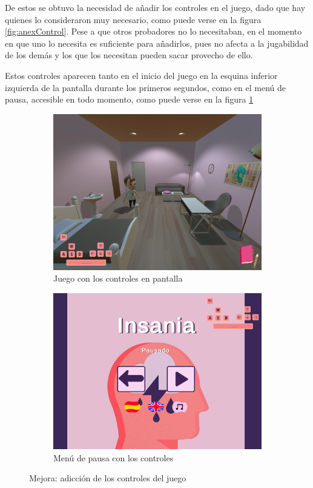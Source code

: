 \documentclass[12pt, a4paper,twoside,titlepage]{book}
\begin{document}
De estos se obtuvo la necesidad de añadir los controles en el juego, dado que hay quienes lo consideraron muy necesario, como puede verse en la figura \ref{fig:anexControl}. Pese a que otros probadores no lo necesitaban, en el momento en que uno lo necesita es suficiente para añadirlos, pues no afecta a la jugabilidad de los demás y los que los necesitan pueden sacar provecho de ello. 

Estos controles aparecen tanto en el inicio del juego en la esquina inferior izquierda de la pantalla durante los primeros segundos, como en el menú de pausa, accesible en todo momento, como puede verse en la figura \ref{fig:UXPausaControl}



\begin{figure}
	\centering
	\begin{subfigure}{.5\textwidth}
		\centering
		\includegraphics[width=.95\linewidth]{TGF/Artes/Controles}
		\caption{Juego con los controles en pantalla}		
	\end{subfigure}%
	\begin{subfigure}{.5\textwidth}
		\centering
		\includegraphics[width=.95\linewidth]{TGF/Artes/PausaControles}
		\caption{Menú de pausa con los controles}		
	\end{subfigure}
	\caption{Mejora: adicción de los controles del juego}
	\label{fig:UXPausaControl}
\end{figure}
\end{document}
